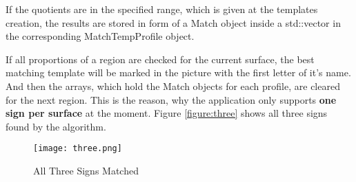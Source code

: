 If the quotients are in the specified range, which is given at the templates creation, the results 
are stored in form of a Match object inside a std::vector in the corresponding MatchTempProfile object.

If all proportions of a region are checked for the current surface, the best matching template will
be marked in the picture with the first letter of it's name. And then the arrays,
which hold the Match objects for each profile, are cleared for the next region. This is the reason, 
why the application only supports \textbf{one sign per surface} at the moment.
Figure \vref{figure:three} shows all three signs found by the algorithm.

\begin{figure}[H]
\begin{center}
  \texttt{[image: three.png]}
  \caption[]{All Three Signs Matched}
  \label{figure:three}
\end{center}
\end{figure}
 
